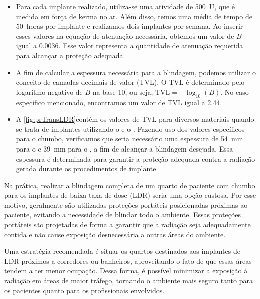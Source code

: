 \documentclass[11pt,a4paper]{article}
\begin{document}
	\begin{tcolorbox}[width=\textwidth, colback={white}, colbacktitle={DarkTurquoise!50!white}, title={$\bigstar$ \LobsterTwo{Exemplo: Blindagem LDR} $\bigstar $}, coltitle={CarnationPink}, colframe={DarkTurquoise}, fonttitle=\rmfamily\bfseries\Large]
		\begin{itemize}
			\item Para cada implante realizado, utiliza-se uma atividade de \SI{500}{U}, que é medida em força de kerma no ar. Além disso, temos uma média de tempo de \SI{50}{horas} por implante e realizamos dois implantes por semana. Ao inserir esses valores na equação de atenuação necessária, obtemos um valor de $B$ igual a \num{0.0036}. Esse valor representa a quantidade de atenuação requerida para alcançar a proteção adequada.

			\item A fim de calcular a espessura necessária para a blindagem, podemos utilizar o conceito de camadas decimais de valor (TVL). O TVL é determinado pelo logaritmo negativo de $B$ na base 10, ou seja, $\text{TVL} = -\log_{10}(B)$. No caso específico mencionado, encontramos um valor de TVL igual a \num{2.44}.
	
			\item A \ref{fig:prTransLDR}contém os valores de TVL para diversos materiais quando se trata de implantes utilizando o  e o . Fazendo uso dos valores específicos para o chumbo, verificamos que seria necessário uma espessura de \SI{54}{mm} para o  e \SI{39}{mm} para o , a fim de alcançar a blindagem desejada. Essa espessura é determinada para garantir a proteção adequada contra a radiação gerada durante os procedimentos de implante.
		\end{itemize}
	\end{tcolorbox}

	Na prática, realizar a blindagem completa de um quarto de paciente com chumbo para os implantes de baixa taxa de dose (LDR) seria uma opção custosa. Por esse motivo, geralmente são utilizadas proteções portáteis posicionadas próximas ao paciente, evitando a necessidade de blindar todo o ambiente. Essas proteções portáteis são projetadas de forma a garantir que a radiação seja adequadamente contida e não cause exposição desnecessária a outras áreas do ambiente.

	Uma estratégia recomendada é situar os quartos destinados aos implantes de LDR próximos a corredores ou banheiros, aproveitando o fato de que essas áreas tendem a ter menor ocupação. Dessa forma, é possível minimizar a exposição à radiação em áreas de maior tráfego, tornando o ambiente mais seguro tanto para os pacientes quanto para os profissionais envolvidos.
\end{document}
